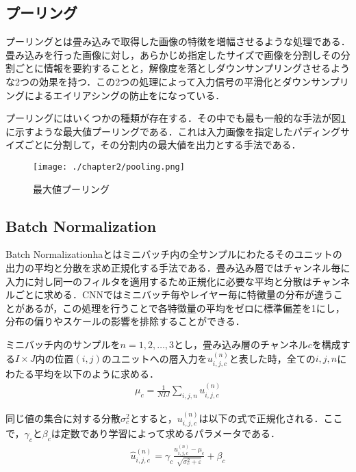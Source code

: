 \subsection{プーリング}
プーリングとは畳み込みで取得した画像の特徴を増幅させるような処理である．畳み込みを行った画像に対し，あらかじめ指定したサイズで画像を分割しその分割ごとに情報を要約することと，解像度を落としダウンサンプリングさせるような2つの効果を持つ．この2つの処理によって入力信号の平滑化とダウンサンプリングによるエイリアシングの防止をになっている．

プーリングにはいくつかの種類が存在する．その中でも最も一般的な手法が図\ref{fig_pooling}に示すような最大値プーリングである．これは入力画像を指定したパディングサイズごとに分割して，その分割内の最大値を出力とする手法である．
\begin{figure}[!b]
  \begin{center}
    \texttt{[image: ./chapter2/pooling.png]}
    \caption{最大値プーリング}
    \label{fig_pooling}
  \end{center}
\end{figure}

\subsection{Batch Normalization}
Batch Normalizationhaとはミニバッチ内の全サンプルにわたるそのユニットの出力の平均と分散を求め正規化する手法である．畳み込み層ではチャンネル毎に入力に対し同一のフィルタを適用するため正規化に必要な平均と分散はチャンネルごとに求める．CNNではミニバッチ毎やレイヤー毎に特徴量の分布が違うことがあるが，この処理を行うことで各特徴量の平均をゼロに標準偏差を1にし，分布の偏りやスケールの影響を排除することができる．

ミニバッチ内のサンプルを$n=1,2,\ldots,3$とし，畳み込み層のチャンネル$c$を構成する$I\times J$内の位置$(i,j)$のユニットへの層入力を$u^{(n)}_{i,j,c}$と表した時，全ての$i,j,n$にわたる平均を以下のように求める．
\begin{align}
  \mu_c = \frac{1}{NIJ} \sum_{i,j,n} u^{(n)}_{i,j,c}
\end{align}

同じ値の集合に対する分散$\sigma^2_c$とすると，$u^{(n)}_{i,j,c}$は以下の式で正規化される．ここで，$\gamma_c$と$\beta_c$は定数であり学習によって求めるパラメータである．
\begin{align}
  \hat{u}^{(n)}_{i,j,c} = \gamma_c \frac{u^{(n)}_{i,j,c} - \mu_c}{\sqrt{\sigma^2_c + \varepsilon}} + \beta_c
\end{align}


